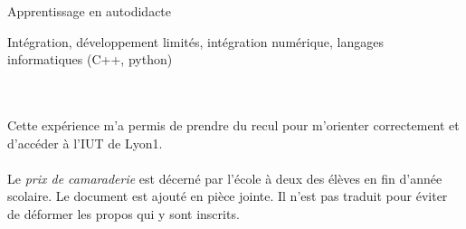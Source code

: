 {	\noindent
	\begin{minipage}{0.20\textwidth}
		\color{MyGray} Apprentissage en autodidacte
	\end{minipage}
	\hfill
	\begin{minipage}{0.70\textwidth}
		Intégration, développement limités, intégration numérique, langages informatiques (C++, python)
	\end{minipage}\\
	\vspace{2mm}
	
	\paragraph{} Cette expérience m'a permis de prendre du recul pour m'orienter correctement et d'accéder à l'IUT de Lyon1.
	
	\paragraph{} Le \emph{prix de camaraderie} est décerné par l'école à deux des élèves en fin d'année scolaire. Le document est ajouté en pièce jointe. Il n'est pas traduit pour éviter de déformer les propos qui y sont inscrits.
}